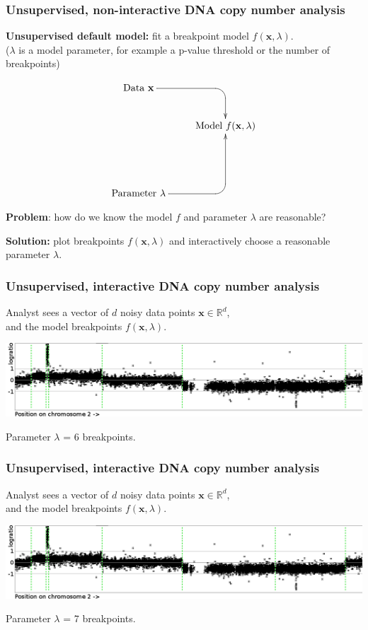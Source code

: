 \documentclass{beamer}
\newcommand{\RR}{\mathbb R}
\begin{document}
\begin{frame}
  \frametitle{Unsupervised, non-interactive DNA copy number analysis}

  \textbf{Unsupervised default model:} 
  fit a breakpoint model $f(\mathbf x, \lambda)$.\\
  ($\lambda$ is a model parameter, for example a p-value threshold or
  the number of breakpoints)

  \begin{displaymath}
  \xymatrix{
    \text{Data $\mathbf x$}
    \ar `[r] [dr] 
    & \text{ }
    \\
    & 
    \text{Model $f(\mathbf x, \lambda)$} 
    \\
    \\
    \text{Parameter $\lambda$} 
    \ar `r[ruu] [ruu]
    & \text{ }
  }
  \end{displaymath}
  
  \textbf{Problem}: how do we know the model $f$ and parameter
  $\lambda$ are reasonable?

  \vskip 0.1in

  \textbf{Solution:} plot breakpoints $f(\mathbf x, \lambda)$ and
  interactively choose a reasonable parameter $\lambda$.
\end{frame}

\begin{frame}
  \frametitle{Unsupervised, interactive DNA copy number analysis}
  Analyst sees a vector of $d$ noisy data points $\mathbf x\in\RR^d$, \\
  and the model breakpoints $f(\mathbf x, \lambda)$.

  \includegraphics[width=\textwidth]{unlabeled-breakpoints-6}

  Parameter $\lambda$ = 6 breakpoints.
\end{frame}

\begin{frame}
  \frametitle{Unsupervised, interactive DNA copy number analysis}
  Analyst sees a vector of $d$ noisy data points $\mathbf x\in\RR^d$, \\
  and the model breakpoints $f(\mathbf x, \lambda)$.

  \includegraphics[width=\textwidth]{unlabeled-breakpoints-7}

  Parameter $\lambda$ = 7 breakpoints.
\end{frame}
\end{document}
